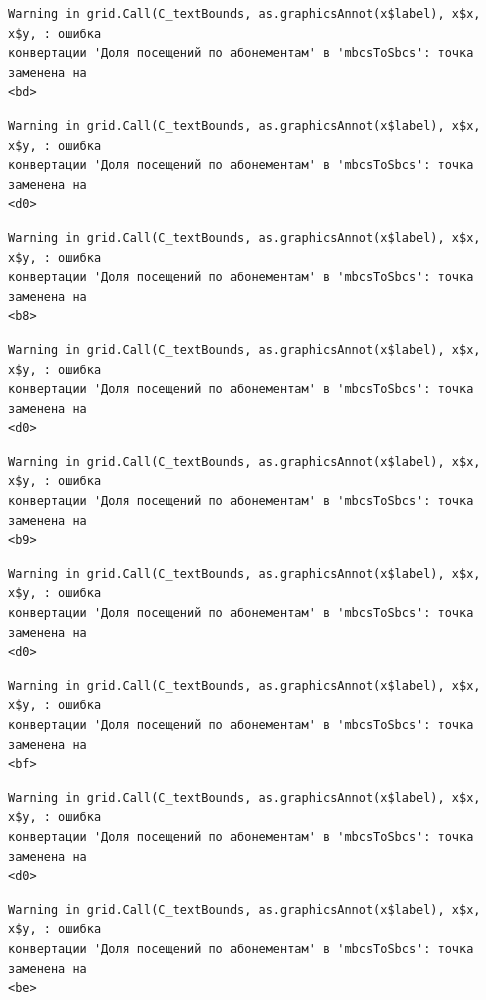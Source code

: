 \documentclass[
  letterpaper,
  DIV=11,
  numbers=noendperiod]{scrreprt}
\begin{document}
\begin{verbatim}
Warning in grid.Call(C_textBounds, as.graphicsAnnot(x$label), x$x, x$y, : ошибка
конвертации 'Доля посещений по абонементам' в 'mbcsToSbcs': точка заменена на
<bd>
\end{verbatim}

\begin{verbatim}
Warning in grid.Call(C_textBounds, as.graphicsAnnot(x$label), x$x, x$y, : ошибка
конвертации 'Доля посещений по абонементам' в 'mbcsToSbcs': точка заменена на
<d0>
\end{verbatim}

\begin{verbatim}
Warning in grid.Call(C_textBounds, as.graphicsAnnot(x$label), x$x, x$y, : ошибка
конвертации 'Доля посещений по абонементам' в 'mbcsToSbcs': точка заменена на
<b8>
\end{verbatim}

\begin{verbatim}
Warning in grid.Call(C_textBounds, as.graphicsAnnot(x$label), x$x, x$y, : ошибка
конвертации 'Доля посещений по абонементам' в 'mbcsToSbcs': точка заменена на
<d0>
\end{verbatim}

\begin{verbatim}
Warning in grid.Call(C_textBounds, as.graphicsAnnot(x$label), x$x, x$y, : ошибка
конвертации 'Доля посещений по абонементам' в 'mbcsToSbcs': точка заменена на
<b9>
\end{verbatim}

\begin{verbatim}
Warning in grid.Call(C_textBounds, as.graphicsAnnot(x$label), x$x, x$y, : ошибка
конвертации 'Доля посещений по абонементам' в 'mbcsToSbcs': точка заменена на
<d0>
\end{verbatim}

\begin{verbatim}
Warning in grid.Call(C_textBounds, as.graphicsAnnot(x$label), x$x, x$y, : ошибка
конвертации 'Доля посещений по абонементам' в 'mbcsToSbcs': точка заменена на
<bf>
\end{verbatim}

\begin{verbatim}
Warning in grid.Call(C_textBounds, as.graphicsAnnot(x$label), x$x, x$y, : ошибка
конвертации 'Доля посещений по абонементам' в 'mbcsToSbcs': точка заменена на
<d0>
\end{verbatim}

\begin{verbatim}
Warning in grid.Call(C_textBounds, as.graphicsAnnot(x$label), x$x, x$y, : ошибка
конвертации 'Доля посещений по абонементам' в 'mbcsToSbcs': точка заменена на
<be>
\end{verbatim}
\end{document}
